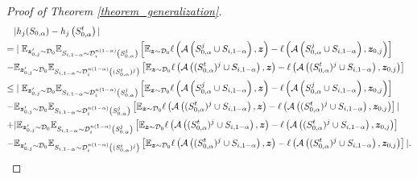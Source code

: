 \begin{proof}[Proof of Theorem \ref{theorem_generalization}]

\begin{align}
&|h_j(S_{0,\alpha})-h_j\left(S_{0,\alpha}^t\right)|\notag \\
= & \mid \mathbb{E}_{\boldsymbol{z}_{0,j}^{\prime} \sim \mathcal{D}_0} \mathbb{E}_{S_{i,1-\alpha} \sim \mathcal{D}_i^{n(1-\alpha)}\left(S_{0,\alpha}^j\right)}\left[\mathbb{E}_{\boldsymbol{z} \sim \mathcal{D}_0} \ell\left(\mathcal{A}\left(S_{0,\alpha}^j \cup S_{i,1-\alpha}\right), \boldsymbol{z}\right)-\ell\left(\mathcal{A}\left(S_{0,\alpha}^j \cup S_{i,1-\alpha}\right), \boldsymbol{z}_{0,j}\right)\right] \notag \\
-&  \mathbb{E}_{\boldsymbol{z}_{0,j}^{\prime} \sim \mathcal{D}_0} \mathbb{E}_{S_{i,1-\alpha} \sim \mathcal{D}_i^{n(1-\alpha)}\left((S_{0,\alpha}^t)^j\right)}\left[\mathbb{E}_{\boldsymbol{z} \sim \mathcal{D}_0} \ell\left(\mathcal{A}\left((S_{0,\alpha}^t)^j \cup S_{i,1-\alpha}\right), \boldsymbol{z}\right)-\ell\left(\mathcal{A}\left((S_{0,\alpha}^t)^j \cup S_{i,1-\alpha}\right), \boldsymbol{z}_{0,j}\right)\right] \notag\\
\leq & \mid \mathbb{E}_{\boldsymbol{z}_{0,j}^{\prime} \sim \mathcal{D}_0} \mathbb{E}_{S_{i,1-\alpha} \sim \mathcal{D}_i^{n(1-\alpha)}\left(S_{0,\alpha}^j\right)}\left[\mathbb{E}_{\boldsymbol{z} \sim \mathcal{D}_0} \ell\left(\mathcal{A}\left(S_{0,\alpha}^j \cup S_{i,1-\alpha}\right), \boldsymbol{z}\right)-\ell\left(\mathcal{A}\left(S_{0,\alpha}^j \cup S_{i,1-\alpha}\right), \boldsymbol{z}_{0,j}\right)\right] \notag \\
-&\mathbb{E}_{\boldsymbol{z}_{0,j}^{\prime} \sim \mathcal{D}_0} \mathbb{E}_{S_{i,1-\alpha} \sim \mathcal{D}_i^{n(1-\alpha)}\left(S_{0,\alpha}^j\right)} \left[\mathbb{E}_{\boldsymbol{z} \sim \mathcal{D}_0} \ell\left(\mathcal{A}\left((S_{0,\alpha}^t)^j \cup S_{i,1-\alpha}\right), \boldsymbol{z}\right)-\ell\left(\mathcal{A}\left((S_{0,\alpha}^t)^j \cup S_{i,1-\alpha}\right), \boldsymbol{z}_{0,j}\right)\right] | \label{proof-8} \\
+&|\mathbb{E}_{\boldsymbol{z}_{0,j}^{\prime} \sim \mathcal{D}_0} \mathbb{E}_{S_{i,1-\alpha} \sim \mathcal{D}_i^{n(1-\alpha)}\left(S_{0,\alpha}^j\right)} \left[\mathbb{E}_{\boldsymbol{z} \sim \mathcal{D}_0} \ell\left(\mathcal{A}\left((S_{0,\alpha}^t)^j \cup S_{i,1-\alpha}\right), \boldsymbol{z}\right)-\ell\left(\mathcal{A}\left((S_{0,\alpha}^t)^j \cup S_{i,1-\alpha}\right), \boldsymbol{z}_{0,j}\right)\right] \notag\\
-&\mathbb{E}_{\boldsymbol{z}_{0,j}^{\prime} \sim \mathcal{D}_0} \mathbb{E}_{S_{i,1-\alpha} \sim \mathcal{D}_i^{n(1-\alpha)}\left((S_{0,\alpha}^t)^j\right)}\left[\mathbb{E}_{\boldsymbol{z} \sim \mathcal{D}_0} \ell\left(\mathcal{A}\left((S_{0,\alpha}^t)^j \cup S_{i,1-\alpha}\right), \boldsymbol{z}\right)-\ell\left(\mathcal{A}\left((S_{0,\alpha}^t)^j \cup S_{i,1-\alpha}\right), \boldsymbol{z}_{0,j}\right)\right]|\label{proof-9}.
\end{align}


\end{proof}
